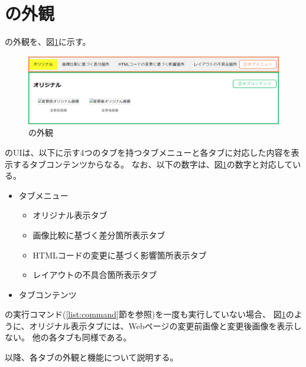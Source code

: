 \section{\toolName の外観}\label{sec:MixVRT_Appearance}
\toolName の外観を、図\ref{fig: Appearance}に示す。
\begin{figure}[tp]
    \begin{center}
        \includegraphics[width=1.0\columnwidth]{image/3_Appearance3.png}
        \caption{\toolName の外観}
        \label{fig: Appearance}
    \end{center}
\end{figure}
\toolName のUIは、以下に示す4つのタブを持つタブメニューと各タブに対応した内容を表示するタブコンテンツからなる。
なお、以下の数字は、図\ref{fig: Appearance}の数字と対応している。
\begin{itemize}
    \item[①] タブメニュー
          \begin{itemize}
              \item オリジナル表示タブ
              \item 画像比較に基づく差分箇所表示タブ
              \item HTMLコードの変更に基づく影響箇所表示タブ
              \item レイアウトの不具合箇所表示タブ
          \end{itemize}
    \item[②] タブコンテンツ
\end{itemize}
\par
\toolName の実行コマンド(\ref{list:command}節を参照)を一度も実行していない場合、
図\ref{fig: Appearance}のように、オリジナル表示タブには、Webページの変更前画像と変更後画像を表示しない。
他の各タブも同様である。
\par
以降、各タブの外観と機能について説明する。

